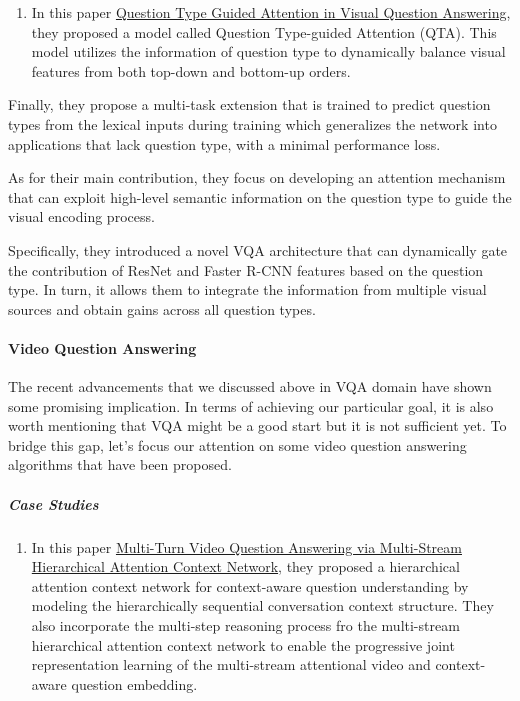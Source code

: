 \documentclass[]{book}
\providecommand{\tightlist}{%
  \setlength{\itemsep}{0pt}\setlength{\parskip}{0pt}}
\let\oldparagraph\paragraph
\renewcommand{\paragraph}[1]{\oldparagraph{#1}\mbox{}}
\let\oldsubparagraph\subparagraph
\renewcommand{\subparagraph}[1]{\oldsubparagraph{#1}\mbox{}}
\theoremstyle{definition}
\theoremstyle{definition}
\theoremstyle{definition}
\theoremstyle{remark}
\begin{document}
\begin{enumerate}
\def\labelenumi{\arabic{enumi}.}
\setcounter{enumi}{1}
\tightlist
\item
  In this paper \href{https://arxiv.org/pdf/1804.02088.pdf}{Question
  Type Guided Attention in Visual Question Answering}, they proposed a
  model called Question Type-guided Attention (QTA). This model utilizes
  the information of question type to dynamically balance visual
  features from both top-down and bottom-up orders.
\end{enumerate}

Finally, they propose a multi-task extension that is trained to predict
question types from the lexical inputs during training which generalizes
the network into applications that lack question type, with a minimal
performance loss.

As for their main contribution, they focus on developing an attention
mechanism that can exploit high-level semantic information on the
question type to guide the visual encoding process.

Specifically, they introduced a novel VQA architecture that can
dynamically gate the contribution of ResNet and Faster R-CNN features
based on the question type. In turn, it allows them to integrate the
information from multiple visual sources and obtain gains across all
question types.

\paragraph{Video Question Answering}\label{video-question-answering}

The recent advancements that we discussed above in VQA domain have shown
some promising implication. In terms of achieving our particular goal,
it is also worth mentioning that VQA might be a good start but it is not
sufficient yet. To bridge this gap, let's focus our attention on some
video question answering algorithms that have been proposed.

\subparagraph{Case Studies}\label{case-studies-2}

\begin{enumerate}
\def\labelenumi{\arabic{enumi}.}
\tightlist
\item
  In this paper
  \href{https://www.ijcai.org/proceedings/2018/0513.pdf}{Multi-Turn
  Video Question Answering via Multi-Stream Hierarchical Attention
  Context Network}, they proposed a hierarchical attention context
  network for context-aware question understanding by modeling the
  hierarchically sequential conversation context structure. They also
  incorporate the multi-step reasoning process fro the multi-stream
  hierarchical attention context network to enable the progressive joint
  representation learning of the multi-stream attentional video and
  context-aware question embedding.
\end{enumerate}
\end{document}
